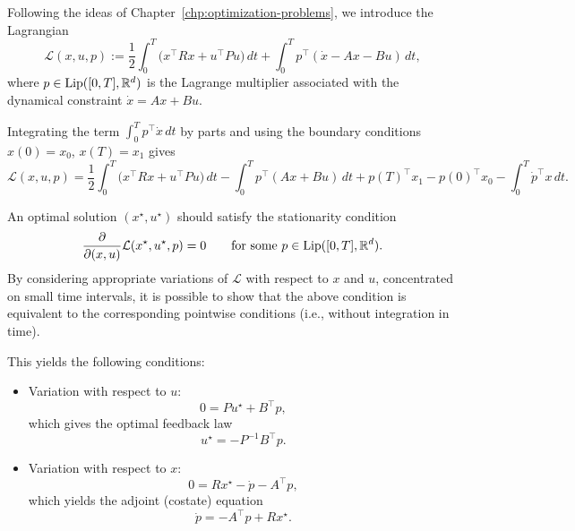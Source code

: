 Following the ideas of Chapter~\ref{chp:optimization-problems}, we introduce the Lagrangian
\begin{equation}
    \mathcal{L}(x,u,p) := \frac12 \int_0^T \big( x^\top R x + u^\top P u \big)\, dt
    + \int_0^T p^\top (\dot x - A x - B u)\, dt,
\end{equation}
where $p \in \operatorname{Lip}([0,T], \mathbb{R}^d)$ is the Lagrange multiplier associated with the dynamical constraint $\dot x = Ax + Bu$. 

Integrating the term $\int_0^T p^\top \dot x\, dt$ by parts and using the boundary conditions $x(0)=x_0$, $x(T)=x_1$ gives
\begin{equation}
    \mathcal{L}(x,u,p) 
    = \frac12 \int_0^T \big( x^\top R x + u^\top P u \big)\, dt
    - \int_0^T p^\top (A x + B u)\, dt
    + p(T)^\top x_1 - p(0)^\top x_0 - \int_0^T \dot p^\top x \, dt.
\end{equation}

An optimal solution $(x^\star, u^\star)$ should satisfy the stationarity condition
\begin{equation}
    \frac{\partial}{\partial (x,u)} \mathcal{L}(x^\star, u^\star, p) = 0
    \qquad \text{for some } p \in \operatorname{Lip}([0,T], \mathbb{R}^d).
\end{equation}
By considering appropriate variations of $\mathcal{L}$ with respect to $x$ and $u$, concentrated on small time intervals, it is possible to show that the above condition is equivalent to the corresponding pointwise conditions (i.e., without integration in time).

This yields the following conditions:

\begin{itemize}
    \item {Variation with respect to $u$:} 
    \begin{equation}
        0 %
          = P u^\star + B^\top p,
    \end{equation}
    which gives the optimal feedback law
    \[
        u^\star = - P^{-1} B^\top p.
    \]
    
    \item {Variation with respect to $x$:} 
    \begin{equation}
        0 %
          = R x^\star - \dot p - A^\top p,
    \end{equation}
    which yields the adjoint (costate) equation
    \[
        \dot p = - A^\top p + R x^\star.
    \]
\end{itemize}

